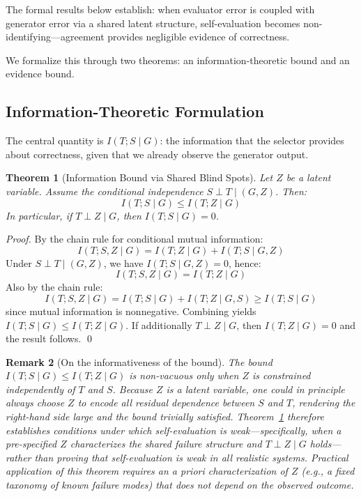 \documentclass[11pt]{article}
\newtheorem{theorem}{Theorem}[section]
\newtheorem{remark}[theorem]{Remark}
\begin{document}
The formal results below establish: when evaluator error is coupled with generator error via
a shared latent structure, self-evaluation becomes non-identifying---agreement provides
negligible evidence of correctness.

We formalize this through two theorems: an information-theoretic bound and an evidence bound.

\subsection{Information-Theoretic Formulation}

The central quantity is $I(T; S \mid G)$: the information that the selector provides about
correctness, given that we already observe the generator output.

\begin{theorem}[Information Bound via Shared Blind Spots]
\label{thm:info_bound}
Let $Z$ be a latent variable. Assume the conditional independence $S \perp T \mid (G, Z)$.
Then:
\begin{equation}
I(T; S \mid G) \leq I(T; Z \mid G)
\end{equation}
In particular, if $T \perp Z \mid G$, then $I(T; S \mid G) = 0$.
\end{theorem}

\begin{proof}
By the chain rule for conditional mutual information:
\begin{equation}
I(T; S, Z \mid G) = I(T; Z \mid G) + I(T; S \mid G, Z)
\end{equation}
Under $S \perp T \mid (G, Z)$, we have $I(T; S \mid G, Z) = 0$, hence:
\begin{equation}
I(T; S, Z \mid G) = I(T; Z \mid G)
\end{equation}
Also by the chain rule:
\begin{equation}
I(T; S, Z \mid G) = I(T; S \mid G) + I(T; Z \mid G, S) \geq I(T; S \mid G)
\end{equation}
since mutual information is nonnegative. Combining yields $I(T; S \mid G) \leq I(T; Z \mid G)$.
If additionally $T \perp Z \mid G$, then $I(T; Z \mid G) = 0$ and the result follows.
\qed
\end{proof}

\begin{remark}[On the informativeness of the bound]
\label{rem:vacuity}
The bound $I(T; S \mid G) \leq I(T; Z \mid G)$ is non-vacuous only when $Z$ is constrained
independently of $T$ and $S$. Because $Z$ is a latent variable, one could in principle
always choose $Z$ to encode all residual dependence between $S$ and $T$, rendering the
right-hand side large and the bound trivially satisfied. Theorem~\ref{thm:info_bound}
therefore establishes \emph{conditions} under which self-evaluation is weak---specifically,
when a pre-specified $Z$ characterizes the shared failure structure and $T \perp Z \mid G$
holds---rather than proving that self-evaluation is weak in all realistic systems. Practical
application of this theorem requires an a priori characterization of $Z$ (e.g., a fixed
taxonomy of known failure modes) that does not depend on the observed outcome.
\end{remark}
\end{document}

